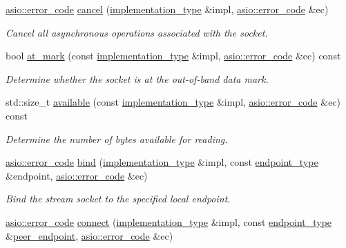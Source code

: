 \begin{DoxyCompactItemize}
\hyperlink{classasio_1_1error__code}{asio\+::error\+\_\+code} \hyperlink{classasio_1_1stream__socket__service_aa74ecbff1de519a84822765feba7c97a}{cancel} (\hyperlink{classasio_1_1stream__socket__service_a3e2c55b4aaf6bab6dfa83c8dbf5b236a}{implementation\+\_\+type} \&impl, \hyperlink{classasio_1_1error__code}{asio\+::error\+\_\+code} \&ec)
\begin{DoxyCompactList}\small\item\em Cancel all asynchronous operations associated with the socket. \end{DoxyCompactList}\item 
bool \hyperlink{classasio_1_1stream__socket__service_a1250ad6bcfb1a37bdca287940c6b7d93}{at\+\_\+mark} (const \hyperlink{classasio_1_1stream__socket__service_a3e2c55b4aaf6bab6dfa83c8dbf5b236a}{implementation\+\_\+type} \&impl, \hyperlink{classasio_1_1error__code}{asio\+::error\+\_\+code} \&ec) const 
\begin{DoxyCompactList}\small\item\em Determine whether the socket is at the out-\/of-\/band data mark. \end{DoxyCompactList}\item 
std\+::size\+\_\+t \hyperlink{classasio_1_1stream__socket__service_a0d4f455496c0ec141dca928082f17482}{available} (const \hyperlink{classasio_1_1stream__socket__service_a3e2c55b4aaf6bab6dfa83c8dbf5b236a}{implementation\+\_\+type} \&impl, \hyperlink{classasio_1_1error__code}{asio\+::error\+\_\+code} \&ec) const 
\begin{DoxyCompactList}\small\item\em Determine the number of bytes available for reading. \end{DoxyCompactList}\item 
\hyperlink{classasio_1_1error__code}{asio\+::error\+\_\+code} \hyperlink{classasio_1_1stream__socket__service_a0e871f8dfc027dcda09e437be2df9e45}{bind} (\hyperlink{classasio_1_1stream__socket__service_a3e2c55b4aaf6bab6dfa83c8dbf5b236a}{implementation\+\_\+type} \&impl, const \hyperlink{classasio_1_1stream__socket__service_a02567f4db6df303c08c6dadc09e76273}{endpoint\+\_\+type} \&endpoint, \hyperlink{classasio_1_1error__code}{asio\+::error\+\_\+code} \&ec)
\begin{DoxyCompactList}\small\item\em Bind the stream socket to the specified local endpoint. \end{DoxyCompactList}\item 
\hyperlink{classasio_1_1error__code}{asio\+::error\+\_\+code} \hyperlink{classasio_1_1stream__socket__service_a23c8694e1969208348c29ff2badb93b2}{connect} (\hyperlink{classasio_1_1stream__socket__service_a3e2c55b4aaf6bab6dfa83c8dbf5b236a}{implementation\+\_\+type} \&impl, const \hyperlink{classasio_1_1stream__socket__service_a02567f4db6df303c08c6dadc09e76273}{endpoint\+\_\+type} \&\hyperlink{classasio_1_1stream__socket__service_a10482eb90896463e21694b8fc352ff96}{peer\+\_\+endpoint}, \hyperlink{classasio_1_1error__code}{asio\+::error\+\_\+code} \&ec)

\end{DoxyCompactItemize}
